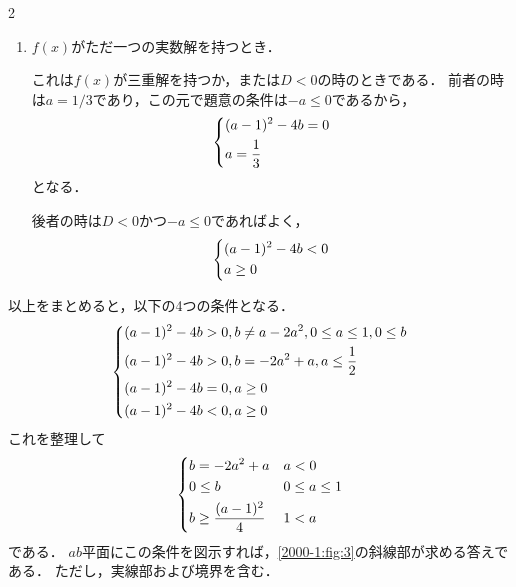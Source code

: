 \documentclass[../../main.tex]{subfiles}
\begin{document}
\begin{multicols}{2}
\begin{enumerate}
      後者の条件は，\cref{eq:2}より
      \begin{align}
        b & = - 2a^2+a        \\
        D & = (a-1)^2 -4b > 0
      \end{align}
      であり，この時$g(x)$のもう一つの解は解と係数の関係から
      \begin{align}
        x = 2a - 1
      \end{align}
      である．題意の条件はこれが$0$以下であることで
      \begin{align}
        & 2a-1 \le 0        \\
        & a \le \dfrac{1}{2}
      \end{align}
      である．
    \item  $f(x)$がただ一つの実数解を持つとき．

      これは$f(x)$が三重解を持つか，または$D<0$の時のときである．
      前者の時は$a=1/3$であり，この元で題意の条件は$-a \le 0$であるから，
      \begin{align}
        \begin{dcases}
          (a-1)^2 -4b = 0 \\
          a = \dfrac{1}{3}
        \end{dcases}
      \end{align}
      となる．

      後者の時は$D<0$かつ$-a \le 0$であればよく，
      \begin{align}
        \begin{dcases}
          (a-1)^2 -4b < 0 \\
          a \ge 0
        \end{dcases}
      \end{align}
  \end{enumerate}

  以上をまとめると，以下の4つの条件となる．
  \begin{align}
    \begin{dcases}
      (a-1)^2-4b > 0, b \neq a-2a^2, 0 \le a \le 1, 0 \le b          \\
      (a-1)^2 -4b > 0, b = - 2a^2+a, a\le \dfrac{1}{2} \\
      (a-1)^2 -4b = 0, a \ge 0                        \\
      (a-1)^2 -4b < 0 ,      a \ge 0                  \\
    \end{dcases}
  \end{align}
  これを整理して
  \begin{align}
    \begin{dcases}
      b = - 2a^2+a            & a < 0         \\
      0 \le b                 & 0 \le a \le 1 \\
      b \ge \dfrac{(a-1)^2}{4} & 1 < a
    \end{dcases}
  \end{align}
  である．
  $ab$平面にこの条件を図示すれば，\cref{2000-1:fig:3}の斜線部が求める答えである．
  ただし，実線部および境界を含む．


\end{multicols}
\end{document}
